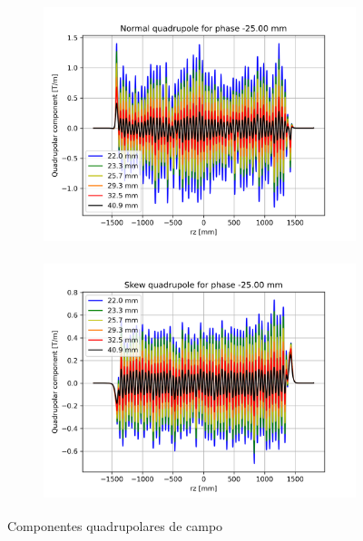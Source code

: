 \documentclass[a4paper,12pt]{article}
\begin{document}
\begin{figure}[H]
\begin{subfigure}{0.5\textwidth}
\includegraphics[width=0.9\linewidth, height=7cm]{figs/phase-25 Normal quadrupole.png} 
\label{fig:subim1-25q}
\end{subfigure}
\begin{subfigure}{0.5\textwidth}
\includegraphics[width=0.9\linewidth, height=7cm]{figs/phase-25 Skew quadrupole.png}
\label{fig:subim2-25q}
\end{subfigure}
\caption{Componentes quadrupolares de campo}
\label{fig:quad-25}
\end{figure}
\end{document}
